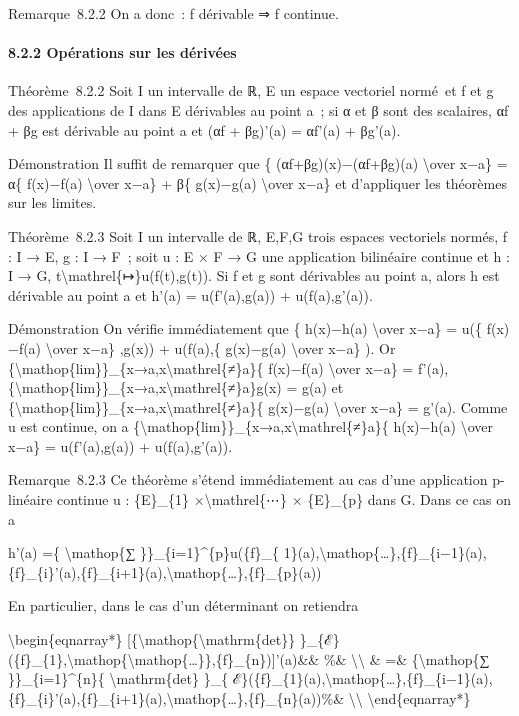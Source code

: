 \documentclass[]{article}
\begin{document}
Remarque~8.2.2 On a donc~: f dérivable ⇒ f continue.

\paragraph{8.2.2 Opérations sur les dérivées}

Théorème~8.2.2 Soit I un intervalle de ℝ, E un espace vectoriel normé~et
f et g des applications de I dans E dérivables au point a~; si α et β
sont des scalaires, αf + βg est dérivable au point a et (αf + βg)'(a) =
αf'(a) + βg'(a).

Démonstration Il suffit de remarquer que \{ (αf+βg)(x)−(αf+βg)(a)
\textbackslash{}over x−a\} = α\{ f(x)−f(a) \textbackslash{}over x−a\} +
β\{ g(x)−g(a) \textbackslash{}over x−a\} et d'appliquer les théorèmes
sur les limites.

Théorème~8.2.3 Soit I un intervalle de ℝ, E,F,G trois espaces vectoriels
normés, f : I → E, g : I → F~; soit u : E × F → G une application
bilinéaire continue et h : I → G,
t\textbackslash{}mathrel\{↦\}u(f(t),g(t)). Si f et g sont dérivables au
point a, alors h est dérivable au point a et h'(a) = u(f'(a),g(a)) +
u(f(a),g'(a)).

Démonstration On vérifie immédiatement que \{ h(x)−h(a)
\textbackslash{}over x−a\} = u(\{ f(x)−f(a) \textbackslash{}over x−a\}
,g(x)) + u(f(a),\{ g(x)−g(a) \textbackslash{}over x−a\} ). Or
\{\textbackslash{}mathop\{lim\}\}\_\{x→a,x\textbackslash{}mathrel\{≠\}a\}\{
f(x)−f(a) \textbackslash{}over x−a\} = f'(a),
\{\textbackslash{}mathop\{lim\}\}\_\{x→a,x\textbackslash{}mathrel\{≠\}a\}g(x)
= g(a) et
\{\textbackslash{}mathop\{lim\}\}\_\{x→a,x\textbackslash{}mathrel\{≠\}a\}\{
g(x)−g(a) \textbackslash{}over x−a\} = g'(a). Comme u est continue, on a
\{\textbackslash{}mathop\{lim\}\}\_\{x→a,x\textbackslash{}mathrel\{≠\}a\}\{
h(x)−h(a) \textbackslash{}over x−a\} = u(f'(a),g(a)) + u(f(a),g'(a)).

Remarque~8.2.3 Ce théorème s'étend immédiatement au cas d'une
application p-linéaire continue u : \{E\}\_\{1\}
×\textbackslash{}mathrel\{⋯\} × \{E\}\_\{p\} dans G. Dans ce cas on a

h'(a) =\{ \textbackslash{}mathop\{∑ \}\}\_\{i=1\}\^{}\{p\}u(\{f\}\_\{
1\}(a),\textbackslash{}mathop\{\ldots{}\},\{f\}\_\{i−1\}(a),\{f\}\_\{i\}'(a),\{f\}\_\{i+1\}(a),\textbackslash{}mathop\{\ldots{}\},\{f\}\_\{p\}(a))

En particulier, dans le cas d'un déterminant on retiendra

\textbackslash{}begin\{eqnarray*\}
{[}\{\textbackslash{}mathop\{\textbackslash{}mathrm\{det\}\}
\}\_\{ℰ\}(\{f\}\_\{1\},\textbackslash{}mathop\{\textbackslash{}mathop\{\ldots{}\}\},\{f\}\_\{n\}){]}'(a)\&\&
\%\& \textbackslash{}\textbackslash{} \& =\& \{\textbackslash{}mathop\{∑
\}\}\_\{i=1\}\^{}\{n\}\{ \textbackslash{}mathrm\{det\} \}\_\{
ℰ\}(\{f\}\_\{1\}(a),\textbackslash{}mathop\{\ldots{}\},\{f\}\_\{i−1\}(a),\{f\}\_\{i\}'(a),\{f\}\_\{i+1\}(a),\textbackslash{}mathop\{\ldots{}\},\{f\}\_\{n\}(a))\%\&
\textbackslash{}\textbackslash{} \textbackslash{}end\{eqnarray*\}
\end{document}
